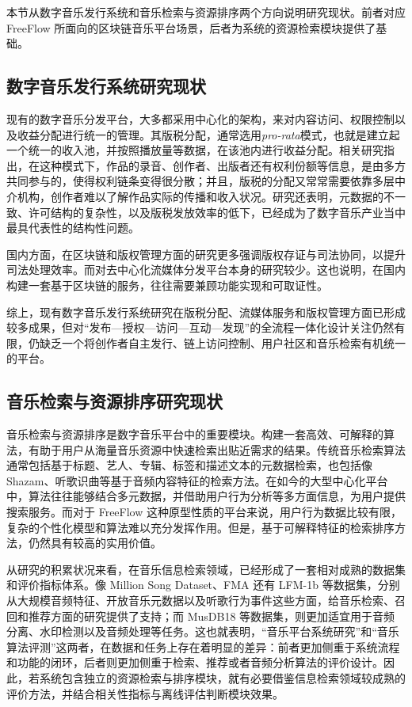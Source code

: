 本节从数字音乐发行系统和音乐检索与资源排序两个方向说明研究现状。前者对应 FreeFlow 所面向的区块链音乐平台场景，后者为系统的资源检索模块提供了基础。

\subsection{数字音乐发行系统研究现状}

现有的数字音乐分发平台，大多都采用中心化的架构，来对内容访问、权限控制以及收益分配进行统一的管理。其版税分配，通常选用\textit{pro-rata}模式，也就是建立起一个统一的收入池，并按照播放量等数据，在该池内进行收益分配\cite{Alaei2022ProRata,Moreau2024PaymentModels}。相关研究指出，在这种模式下，作品的录音、创作者、出版者还有权利份额等信息，是由多方共同参与的，使得权利链条变得很分散；并且，版税的分配又常常需要依靠多层中介机构，创作者难以了解作品实际的传播和收入状况\cite{Torbensen2019,Arenal2024}。研究还表明，元数据的不一致、许可结构的复杂性，以及版税发放效率的低下，已经成为了数字音乐产业当中最具代表性的结构性问题\cite{Torbensen2019,Arenal2024}。

国内方面，在区块链和版权管理方面的研究更多强调版权存证与司法协同，以提升司法处理效率\cite{chinaCopyrightChain2021,beijingCopyrightChain2022}。而对去中心化流媒体分发平台本身的研究较少。这也说明，在国内构建一套基于区块链的服务，往往需要兼顾功能实现和可取证性\cite{chinaCopyrightChain2021,beijingCopyrightChain2022}。

综上，现有数字音乐发行系统研究在版税分配、流媒体服务和版权管理方面已形成较多成果，但对“发布—授权—访问—互动—发现”的全流程一体化设计关注仍然有限，仍缺乏一个将创作者自主发行、链上访问控制、用户社区和音乐检索有机统一的平台\cite{Li2021,Niu2022,Shi2025}。

\subsection{音乐检索与资源排序研究现状}

音乐检索与资源排序是数字音乐平台中的重要模块。构建一套高效、可解释的算法，有助于用户从海量音乐资源中快速检索出贴近需求的结果。传统音乐检索算法通常包括基于标题、艺人、专辑、标签和描述文本的元数据检索，也包括像 Shazam、听歌识曲等基于音频内容特征的检索方法。在如今的大型中心化平台中，算法往往能够结合多元数据，并借助用户行为分析等多方面信息，为用户提供搜索服务。而对于 FreeFlow 这种原型性质的平台来说，用户行为数据比较有限，复杂的个性化模型和算法难以充分发挥作用。但是，基于可解释特征的检索排序方法，仍然具有较高的实用价值。

从研究的积累状况来看，在音乐信息检索领域，已经形成了一套相对成熟的数据集和评价指标体系。像 Million Song Dataset、FMA 还有 LFM-1b 等数据集，分别从大规模音频特征、开放音乐元数据以及听歌行为事件这些方面，给音乐检索、召回和推荐方面的研究提供了支持；而 MusDB18 等数据集，则更加适宜用于音频分离、水印检测以及音频处理等任务。这也就表明，“音乐平台系统研究”和“音乐算法评测”这两者，在数据和任务上存在着明显的差异：前者更加侧重于系统流程和功能的闭环，后者则更加侧重于检索、推荐或者音频分析算法的评价设计。因此，若系统包含独立的资源检索与排序模块，就有必要借鉴信息检索领域较成熟的评价方法，并结合相关性指标与离线评估判断模块效果\cite{msd2011,fma2017,lfm1b2016}。

